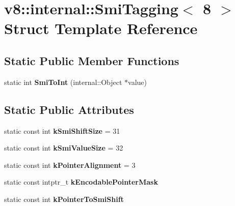 \hypertarget{structv8_1_1internal_1_1_smi_tagging_3_018_01_4}{}\section{v8\+:\+:internal\+:\+:Smi\+Tagging$<$ 8 $>$ Struct Template Reference}
\label{structv8_1_1internal_1_1_smi_tagging_3_018_01_4}
\subsection*{Static Public Member Functions}
\begin{DoxyCompactItemize}
\item 
\hypertarget{structv8_1_1internal_1_1_smi_tagging_3_018_01_4_a4103aa6decb48426824509917ab3b50e}{}static int {\bfseries Smi\+To\+Int} (internal\+::\+Object $\ast$value)\label{structv8_1_1internal_1_1_smi_tagging_3_018_01_4_a4103aa6decb48426824509917ab3b50e}

\end{DoxyCompactItemize}
\subsection*{Static Public Attributes}
\begin{DoxyCompactItemize}
\item 
\hypertarget{structv8_1_1internal_1_1_smi_tagging_3_018_01_4_a9a3b3da7b6d82417b961c8bed4366407}{}static const int {\bfseries k\+Smi\+Shift\+Size} = 31\label{structv8_1_1internal_1_1_smi_tagging_3_018_01_4_a9a3b3da7b6d82417b961c8bed4366407}

\item 
\hypertarget{structv8_1_1internal_1_1_smi_tagging_3_018_01_4_a08ad86fa77f6faee6ec744abdb0f6dce}{}static const int {\bfseries k\+Smi\+Value\+Size} = 32\label{structv8_1_1internal_1_1_smi_tagging_3_018_01_4_a08ad86fa77f6faee6ec744abdb0f6dce}

\item 
\hypertarget{structv8_1_1internal_1_1_smi_tagging_3_018_01_4_a9e1cba2a4357caa90cd199ed96407aff}{}static const int {\bfseries k\+Pointer\+Alignment} = 3\label{structv8_1_1internal_1_1_smi_tagging_3_018_01_4_a9e1cba2a4357caa90cd199ed96407aff}

\item 
static const intptr\+\_\+t {\bfseries k\+Encodable\+Pointer\+Mask}
\item 
static const int {\bfseries k\+Pointer\+To\+Smi\+Shift}
\end{DoxyCompactItemize}


